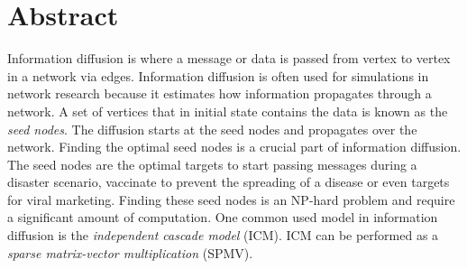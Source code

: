 \section*{Abstract}

Information diffusion is where a message or data is passed from vertex to vertex in a network via edges. Information diffusion is often used for simulations in network research because it estimates how information propagates through a network. A set of vertices that in initial state contains the data is known as the \textit{seed nodes}. The diffusion starts at the seed nodes and propagates over the network. Finding the optimal seed nodes is a crucial part of information diffusion. The seed nodes are the optimal targets to start passing messages during a disaster scenario, vaccinate to prevent the spreading of a disease or even targets for viral marketing. Finding these seed nodes is an NP-hard problem and require a significant amount of computation. One common used model in information diffusion is the \textit{independent cascade model} (ICM). ICM can be performed as a \textit{sparse matrix-vector multiplication} (SPMV). 